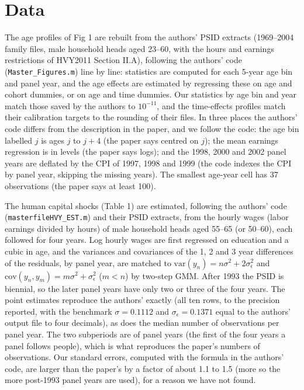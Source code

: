 \documentclass[11pt,fleqn]{article}
\begin{document}
\section{Data}

The age profiles of Fig 1 are rebuilt from the authors' PSID extracts (1969--2004 family files, male household heads aged 23--60, with the hours and earnings restrictions of HVY2011 Section II.A), following the authors' code (\verb|Master_Figures.m|) line by line: statistics are computed for each 5-year age bin and panel year, and the age effects are estimated by regressing these on age and cohort dummies, or on age and time dummies. Our statistics by age bin and year match those saved by the authors to $10^{-11}$, and the time-effects profiles match their calibration targets to the rounding of their files. In three places the authors' code differs from the description in the paper, and we follow the code: the age bin labelled $j$ is ages $j$ to $j+4$ (the paper says centred on $j$); the mean earnings regression is in levels (the paper says logs); and the 1998, 2000 and 2002 panel years are deflated by the CPI of 1997, 1998 and 1999 (the code indexes the CPI by panel year, skipping the missing years). The smallest age-year cell has 37 observations (the paper says at least 100).

The human capital shocks (Table 1) are estimated, following the authors' code (\verb|masterfileHVY_EST.m|) and their PSID extracts, from the hourly wages (labor earnings divided by hours) of male household heads aged 55--65 (or 50--60), each followed for four years. Log hourly wages are first regressed on education and a cubic in age, and the variances and covariances of the 1, 2 and 3 year differences of the residuals, by panel year, are matched to $\text{var}(y_n)=n\sigma^2+2\sigma_\epsilon^2$ and $\text{cov}(y_n,y_m)=m\sigma^2+\sigma_\epsilon^2$ ($m<n$) by two-step GMM. After 1993 the PSID is biennial, so the later panel years have only two or three of the four years. The point estimates reproduce the authors' exactly (all ten rows, to the precision reported, with the benchmark $\sigma=0.1112$ and $\sigma_\epsilon=0.1371$ equal to the authors' output file to four decimals), as does the median number of observations per panel year. The two subperiods are of panel years (the first of the four years a panel follows people), which is what reproduces the paper's numbers of observations. Our standard errors, computed with the formula in the authors' code, are larger than the paper's by a factor of about 1.1 to 1.5 (more so the more post-1993 panel years are used), for a reason we have not found.
\end{document}
